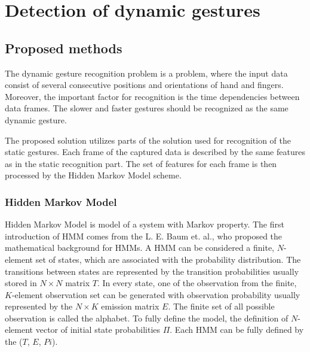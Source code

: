 \chapter{Detection of dynamic gestures}

\section{Proposed methods}

The dynamic gesture recognition problem is a problem, where the input data consist of several consecutive positions and orientations of hand and fingers. 
Moreover, the important factor for recognition is the time dependencies between data frames. 
The slower and faster gestures should be recognized as the same dynamic gesture.

The proposed solution utilizes parts of the solution used for recognition of the static gestures.
Each frame of the captured data is described by the same features as in the static recognition part.
The set of features for each frame is then processed by the Hidden Markov Model scheme. 

\subsection{Hidden Markov Model}

Hidden Markov Model is model of a system with Markov property.
The first introduction of HMM comes from the L. E. Baum et. al.\cite{hmmfirst}, who proposed the mathematical background for HMMs.
A HMM can be considered a finite, $N$-element set of states, which are associated with the probability distribution.
The transitions between states are represented by the transition probabilities usually stored in $N\times N$ matrix $T$.
In every state, one of the observation from the finite, $K$-element observation set can be generated with observation probability usually represented by the $N\times K$ emission matrix $E$.
The finite set of all possible observation is called the alphabet.
To fully define the model, the definition of $N$-element vector of initial state probabilities $\Pi$.
Each HMM can be fully defined by the ($T$, $E$, $Pi$).

